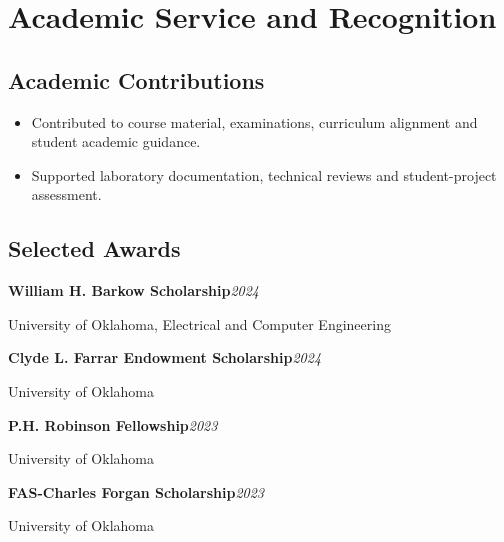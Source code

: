 \documentclass[9pt,letterpaper]{extarticle}
\newcommand{\entry}[2]{\Needspace{4\baselineskip}\textbf{#1}\hfill\textit{#2}\par}
\begin{document}
\section{Academic Service and Recognition}
\subsection{Academic Contributions}
\begin{itemize}
\item Contributed to course material, examinations, curriculum alignment and student academic guidance.
\item Supported laboratory documentation, technical reviews and student-project assessment.
\end{itemize}
\subsection{Selected Awards}
\entry{William H. Barkow Scholarship}{2024}
{\small University of Oklahoma, Electrical and Computer Engineering\par}
\entry{Clyde L. Farrar Endowment Scholarship}{2024}
{\small University of Oklahoma\par}
\entry{P.H. Robinson Fellowship}{2023}
{\small University of Oklahoma\par}
\entry{FAS-Charles Forgan Scholarship}{2023}
{\small University of Oklahoma\par}
\end{document}

